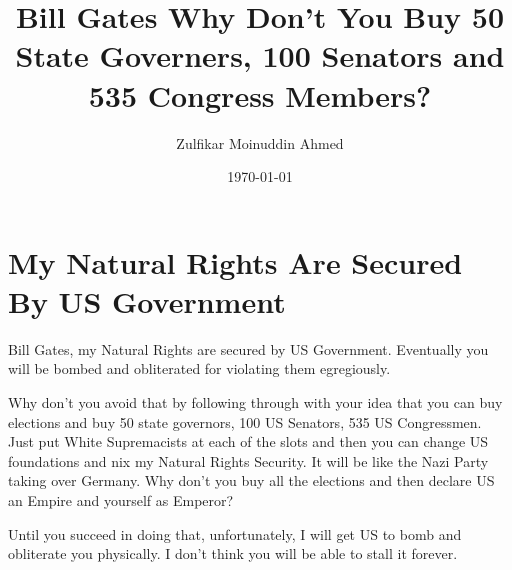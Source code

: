 \documentclass{amsart}
\title{Bill Gates Why Don't You Buy 50 State Governers, 100 Senators and 535 Congress Members?}
\author{Zulfikar Moinuddin Ahmed}
\date{\today}
\begin{document}
\maketitle


\section{My Natural Rights Are Secured By US Government}

Bill Gates, my Natural Rights are secured by US Government.  Eventually you will be bombed and obliterated for violating them egregiously.

Why don't you avoid that by following through with your idea that you can buy elections and buy 50 state governors, 100 US Senators, 535 US Congressmen.  Just put White Supremacists at each of the slots and then you can change US foundations and nix my Natural Rights Security.  It will be like the Nazi Party taking over Germany.  Why don't you buy all the elections and then declare US an Empire and yourself as Emperor?  

Until you succeed in doing that, unfortunately, I will get US to bomb and obliterate you physically.  I don't think you will be able to stall it forever.
\end{document}
